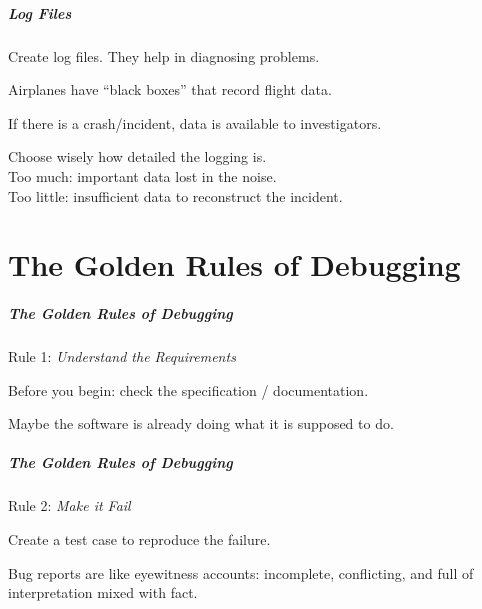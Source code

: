 \begin{frame}
\frametitle{Log Files}
\begin{changemargin}{1cm}
Create log files. They help in diagnosing problems.

Airplanes have ``black boxes'' that record flight data.

If there is a crash/incident, data is available to investigators.

Choose wisely how detailed the logging is.\\
\quad Too much: important data lost in the noise.\\
\quad Too little: insufficient data to reconstruct the incident.


\end{changemargin}
\end{frame}

\part{The Golden Rules of Debugging}

\begin{frame}
\frametitle{The Golden Rules of Debugging}
\begin{changemargin}{1cm}

Rule 1: \emph{Understand the Requirements}

Before you begin: check the specification / documentation.

Maybe the software is already doing what it is supposed to do.

\end{changemargin}
\end{frame}

\begin{frame}
\frametitle{The Golden Rules of Debugging}
\begin{changemargin}{1cm}

Rule 2: \emph{Make it Fail}

Create a test case to reproduce the failure. 

Bug reports are like eyewitness accounts: incomplete, conflicting, and full of interpretation mixed with fact. 

\end{changemargin}
\end{frame}

